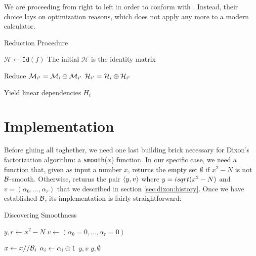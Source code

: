 \begin{remark}
  We are proceeding from right to left in order to conform with
  \cite{morrison-brillhart}.
  Instead, their choice lays on optimization reasons, which does
  not apply any more to a modern calculator.
\end{remark}

\begin{algorithm}
  \caption{Reduction Procedure  \label{alg:dixon:kernel}}
  \begin{algorithmic}[1]
    \State $\mathcal{H} \gets \texttt{Id}(f)$
    \Comment The initial $\mathcal{H}$ is the identity matrix

    \Comment Reduce
              \State $\mathcal{M}_{i'} = \mathcal{M}_i \oplus \mathcal{M}_{i'}$
              \State $\mathcal{H}_{i'} = \mathcal{H}_i \oplus \mathcal{H}_{i'}$
            \EndIf
          \EndFor
          \State {}
        \EndIf
      \EndFor
    \EndFor

    \Comment Yield linear dependencies
        $H_i$ \EndIf
    \EndFor
    \EndProcedure
  \end{algorithmic}
\end{algorithm}


\section{Implementation}

Before gluing all toghether, we need one last building brick necessary for
Dixon's factorization algorithm: a \texttt{smooth}($x$) function. In our
specific case, we need a function that, given as input a number $x$, returns the
empty set $\emptyset$ if $x^2 -N$ is not $\mathcal{B}$-smooth. Otherwise,
returns the pair $\langle y, v\rangle$ where $y = isqrt(x^2 - N)$ and
$v = (\alpha_0, \ldots, \alpha_r)$ that we described in section
\ref{sec:dixon:history}. Once we have established $\mathcal{B}$, its
implementation is fairly straightforward:

\begin{algorithm}
  \caption{Discovering Smoothness}
  \begin{algorithmic}[1]
      \State $y, r \gets x^2 -N$
      \State $v \gets (\alpha_0 = 0, \ldots, \alpha_r = 0)$

          \EndIf
        \State $x \gets x// \mathcal{B}_i$
        \State $\alpha_i \gets \alpha_i \oplus 1$
      \EndFor
       \State \Return $y, v$
      \Else \State \Return $y, \emptyset$
      \EndIf
    \EndProcedure
  \end{algorithmic}
\end{algorithm}
